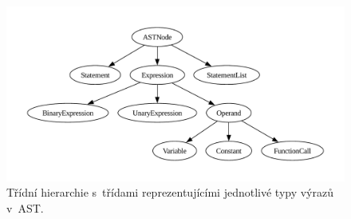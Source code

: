 \begin{figure}[h]
    \centering
    \includegraphics[width=\textwidth]{obrazky-figures/hierarchy_expression.pdf}
    \caption{Třídní hierarchie s~třídami reprezentujícími jednotlivé typy výrazů v~AST.}
    \label{fig_hierarchie_expression}
\end{figure}





%
